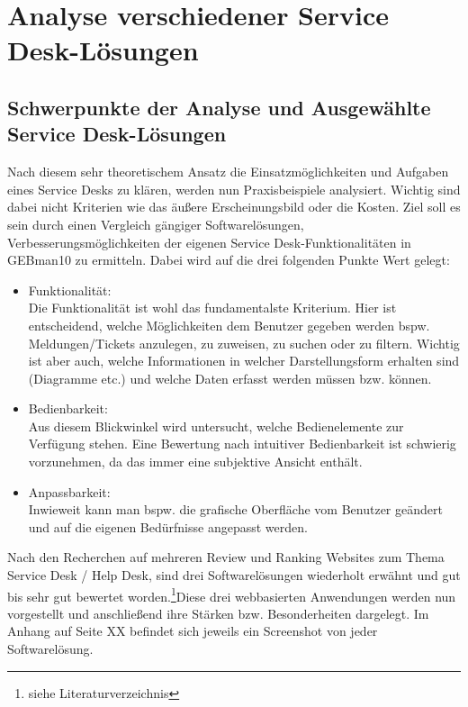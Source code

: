 \section{Analyse verschiedener Service Desk-Lösungen}

\subsection{Schwerpunkte der Analyse und Ausgewählte Service Desk-Lösungen}

\noindent
Nach diesem sehr theoretischem Ansatz die Einsatzmöglichkeiten und Aufgaben eines Service Desks zu klären, werden nun Praxisbeispiele analysiert. Wichtig sind dabei nicht Kriterien wie das äußere Erscheinungsbild oder die Kosten. Ziel soll es sein durch einen Vergleich gängiger Softwarelösungen, Verbesserungsmöglichkeiten der eigenen Service Desk-Funktionalitäten in GEBman10 zu ermitteln. Dabei wird auf die drei folgenden Punkte Wert gelegt:

\begin{itemize}
\item Funktionalität:\\
		Die Funktionalität ist wohl das fundamentalste Kriterium. Hier ist entscheidend, welche 			
		Möglichkeiten dem Benutzer gegeben werden bspw. Meldungen/Tickets anzulegen, zu 
		zuweisen, zu suchen oder zu filtern. Wichtig ist aber auch, welche Informationen in welcher 
		Darstellungsform erhalten sind (Diagramme etc.) und welche Daten erfasst werden müssen 
		bzw. können.\\
		 
\item Bedienbarkeit:\\
		Aus diesem Blickwinkel wird untersucht, welche Bedienelemente zur Verfügung stehen. Eine	
		Bewertung nach intuitiver Bedienbarkeit ist schwierig vorzunehmen, da das immer eine
		subjektive Ansicht enthält.\\
		
\item Anpassbarkeit:\\
		Inwieweit kann man bspw. die grafische Oberfläche vom Benutzer geändert und auf die 
		eigenen Bedürfnisse angepasst werden.\\		
\end{itemize}


\noindent
Nach den Recherchen auf mehreren Review und Ranking Websites zum Thema Service Desk / Help Desk, sind drei Softwarelösungen wiederholt erwähnt und gut bis sehr gut bewertet worden.\footnote{siehe Literaturverzeichnis}Diese drei webbasierten Anwendungen werden nun vorgestellt und anschließend ihre Stärken bzw. Besonderheiten dargelegt. Im Anhang auf Seite XX befindet sich jeweils ein Screenshot von jeder Softwarelösung.

